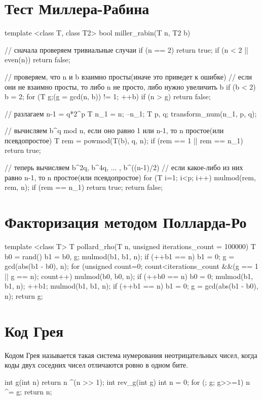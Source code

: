 \documentclass[12pt, titlepage]{article}
\begin{document}
\section{Тест Миллера-Рабина}
\begin{cppcode}
template <class T, class T2>
bool miller_rabin(T n, T2 b)
{
    // сначала проверяем тривиальные случаи
    if (n == 2)
        return true;
    if (n < 2 || even(n))
        return false;

    // проверяем, что n и b взаимно просты(иначе это приведет к ошибке)
    // если они не взаимно просты, то либо n не просто, либо нужно увеличить b
    if (b < 2)
        b = 2;
    for (T g;(g = gcd(n, b)) != 1; ++b)
        if (n > g)
            return false;

    // разлагаем n-1 = q*2^p
    T n_1 = n;
    --n_1;
    T p, q;
    transform_num(n_1, p, q);

    // вычисляем b^q mod n, если оно равно 1 или n-1, то n простое(или псевдопростое)
    T rem = powmod(T(b), q, n);
    if (rem == 1 || rem == n_1)
        return true;

    // теперь вычисляем b^2q, b^4q, ... , b^((n-1)/2)
    // если какое-либо из них равно n-1, то n простое(или псевдопростое)
    for (T i=1; i<p; i++)
    {
        mulmod(rem, rem, n);
        if (rem == n_1)
            return true;
    }
    return false;
}
\end{cppcode}

\section{Факторизация методом Полларда-Ро}
\begin{cppcode}
template <class T>
T pollard_rho(T n, unsigned iterations_count = 100000)
{
    T   b0 = rand() %
        b1 = b0,
        g;
    mulmod(b1, b1, n);
    if (++b1 == n)
        b1 = 0;
    g = gcd(abs(b1 - b0), n);
    for (unsigned count=0; count<iterations_count &&(g == 1 || g == n); count++)
    {
        mulmod(b0, b0, n);
        if (++b0 == n)
            b0 = 0;
        mulmod(b1, b1, n);
        ++b1;
        mulmod(b1, b1, n);
        if (++b1 == n)
            b1 = 0;
        g = gcd(abs(b1 - b0), n);
    }
    return g;
}
\end{cppcode}


\section{Код Грея}
Кодом Грея называется такая система нумерования неотрицательных чисел, когда коды двух соседних чисел отличаются ровно в одном бите.
\begin{cppcode}
int g(int n) {
    return n ^(n >> 1);
}
int rev_g(int g) {
    int n = 0;
    for (; g; g>>=1) n ^= g;
    return n;
}
\end{cppcode}
\end{document}
